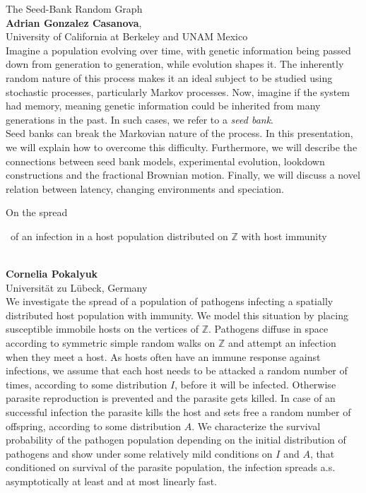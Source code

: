 \documentclass[12pt,a4paper]{article}
\newcommand{\ZAbst}{\rule[-1ex]{0pt}{2ex}\ } %
\begin{document}
\noindent
{\Large The Seed-Bank Random Graph}\\[1ex]
{\large 
\textbf{Adrian Gonzalez Casanova},\\[1ex] University of California at Berkeley and UNAM Mexico}\\[2ex]
{\bf  }
Imagine a population evolving over time, with genetic information being passed down from generation to generation, while evolution shapes it. The inherently random nature of this process makes it an ideal subject to be studied using stochastic processes, particularly Markov processes. Now, imagine if the system had memory, meaning genetic information could be inherited from many generations in the past. In such cases, we refer to a {\em seed bank}.
\\
Seed banks can break the Markovian nature of the process. In this presentation, we will explain how to overcome this difficulty. Furthermore, we will describe the connections between seed bank models, experimental evolution, lookdown constructions and the fractional Brownian motion. Finally, we will discuss a novel relation between latency,  changing environments  and speciation. 


\bigskip
\bigskip


{\Large  
On the spread\ZAbst of an infection in a host population distributed on $\mathbb{Z}$ with host immunity 
}\\[1ex]
{\large 
\textbf{Cornelia Pokalyuk}\\[1ex] Universität zu Lübeck, Germany}\\[2ex]
We investigate the spread of a population of 
pathogens infecting a spatially distributed host population with immunity. We model this situation by placing susceptible immobile hosts on the vertices of $\mathbb{Z}$. Pathogens diffuse in space according to symmetric simple random walks on $\mathbb{Z}$ and attempt an infection when they meet a host. As hosts often have an immune response against infections, we assume that each host needs to be attacked a random number of times, according to some distribution $I$, before it will be infected. Otherwise parasite reproduction is prevented and the parasite gets killed. In case of an successful infection the parasite kills the host and sets free a random number of offspring, according to some distribution $A$.
We characterize the survival probability of the pathogen population depending on the initial distribution of pathogens and show under some relatively mild conditions on $I$ and $A$, that conditioned on survival of the parasite population, the infection spreads a.s. asymptotically at least and at most linearly fast. 
  
\end{document}
